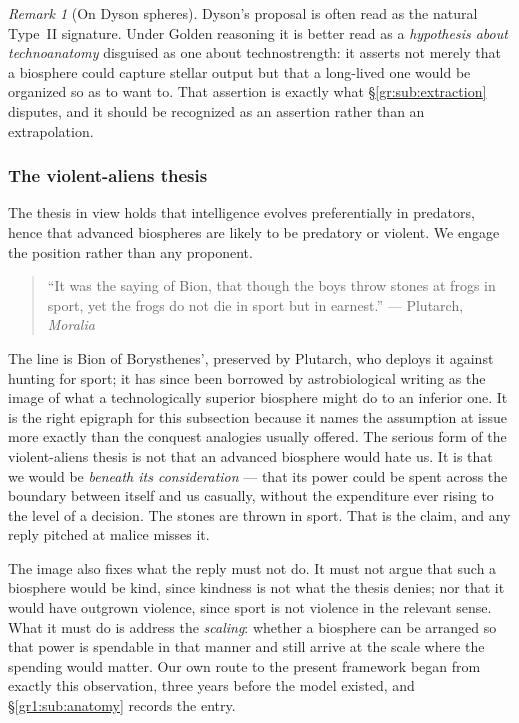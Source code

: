 \documentclass[11pt]{article}
\numberwithin{equation}{section}
\theoremstyle{plain}
\theoremstyle{definition}
\theoremstyle{remark}
\newtheorem{remark}[theorem]{Remark}
\begin{document}
\begin{remark}[On Dyson spheres]\label{gr:rem:dyson}
Dyson's proposal \cite{Dys60} is often read as the natural
Type~II signature. Under Golden reasoning it is better read as a
\emph{hypothesis about technoanatomy} disguised as one about
technostrength: it asserts not merely that a biosphere could capture
stellar output but that a long-lived one would be organized so as to
want to. That assertion is exactly what \S\ref{gr:sub:extraction}
disputes, and it should be recognized as an assertion rather than an
extrapolation.
\end{remark}

\subsubsection{The violent-aliens thesis}\label{gr:subsub:violence}

The thesis in view holds that intelligence evolves preferentially in
predators, hence that advanced biospheres are likely to be predatory or
violent. We engage the position rather than any proponent.

\begin{quote}\small
``It was the saying of Bion, that though the boys throw stones at frogs
in sport, yet the frogs do not die in sport but in earnest.''
\hfill --- Plutarch, \emph{Moralia} \cite{Plutarch}
\end{quote}

\noindent The line is Bion of Borysthenes', preserved by Plutarch, who
deploys it against hunting for sport; it has since been borrowed by
astrobiological writing as the image of what a technologically superior
biosphere might do to an inferior one. It is the right epigraph for this
subsection because it names the assumption at issue more exactly than
the conquest analogies usually offered. The serious form of the
violent-aliens thesis is not that an advanced biosphere would hate us.
It is that we would be \emph{beneath its consideration} --- that its
power could be spent across the boundary between itself and us
casually, without the expenditure ever rising to the level of a
decision. The stones are thrown in sport. That is the claim, and any
reply pitched at malice misses it.

The image also fixes what the reply must not do. It must not argue that
such a biosphere would be kind, since kindness is not what the thesis
denies; nor that it would have outgrown violence, since sport is not
violence in the relevant sense. What it must do is address the
\emph{scaling}: whether a biosphere can be arranged so that power is
spendable in that manner and still arrive at the scale where the
spending would matter. Our own route to the present framework
began from exactly this observation, three years before the model
existed, and \S\ref{gr1:sub:anatomy} records the entry.
\end{document}
